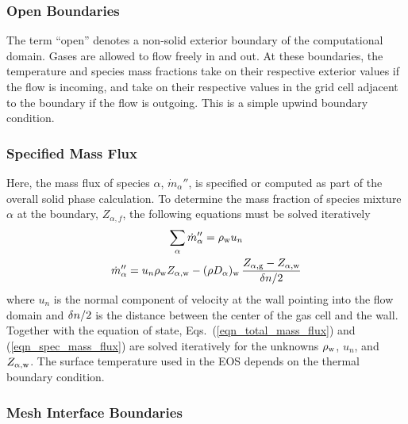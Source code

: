 \subsubsection{Open Boundaries}

The term ``open'' denotes a non-solid exterior boundary of the computational domain. Gases are allowed to flow freely in and out. At these boundaries, the temperature and species mass fractions take on their respective exterior values if the flow is incoming, and take on their respective values in the grid cell adjacent to the boundary if the flow is outgoing. This is a simple upwind boundary condition.



\subsubsection{Specified Mass Flux}

Here, the mass flux of species $\alpha$, $\dot{m}_\alpha''$, is specified or computed as part of the overall solid phase calculation. To determine the mass fraction of species mixture $\alpha$ at the boundary, $Z_{\alpha,f}$, the following equations must be solved iteratively
\begin{gather}
\label{eqn_total_mass_flux} \sum_\alpha \dot{m}_\alpha'' = \rho_{\rm w} u_n \\
\label{eqn_spec_mass_flux}  \dot{m}_\alpha'' = u_n \rho_{\rm w} Z_{\rm \alpha,w} - (\rho D_\alpha)_{\rm w} \, \frac{Z_{\rm \alpha,g}-Z_{\rm \alpha,w}}{\delta n/2}
\end{gather}
where $u_n$ is the normal component of velocity at the wall pointing into the flow domain and $\delta n/2$ is the distance between the center of the gas cell and the wall. Together with the equation of state, Eqs.~(\ref{eqn_total_mass_flux}) and (\ref{eqn_spec_mass_flux}) are solved iteratively for the unknowns $\rho_{\rm w}$, $u_n$, and $Z_{\rm \alpha,w}$.  The surface temperature used in the EOS depends on the thermal boundary condition.


\subsubsection{Mesh Interface Boundaries}

